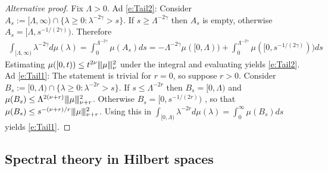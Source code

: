 \documentclass[10pt, a4paper]{iopart}
\newcommand{\normiii}[2]{\vert\kern-0.25ex\vert\kern-0.25ex\vert #1 \vert\kern-0.25ex \vert\kern-0.25ex\vert_{ #2 }}
\theoremstyle{remark}
\theoremstyle{definition}
\begin{document}
{%
\begin{proof}[Alternative proof] %
	Fix $\Lambda > 0$.
	Ad \eqref{e:Tail2}:
	Consider
	$A_s := [\Lambda, \infty) \cap \{ \lambda \geq 0 : \lambda^{-2 \gamma} > s \}$.
	If $s \geq \Lambda^{-2 \gamma}$ then $A_s$ is empty,
	otherwise
	$A_s = [\Lambda, s^{-1/(2\gamma)})$.
	Therefore
	\begin{align}
		\int_{[\Lambda, \infty)} \lambda^{-2 \gamma} d\mu(\lambda)
		=
		\int_0^{\Lambda^{-2 \gamma}} \mu(A_s) ds
		=
		-\Lambda^{-2\gamma} \mu([0, \Lambda))
		+
		\int_0^{\Lambda^{-2 \gamma}} \mu([0, s^{-1/(2\gamma)})) ds
	\end{align}
	Estimating $\mu([0, t)) \leq t^{2 \nu} \normiii{\mu}{\nu}^2$ under the integral
	and evaluating
	yields \eqref{e:Tail2}.
	Ad \eqref{e:Tail1}:
	The statement is trivial for $r = 0$, so suppose $r > 0$.
	Consider 
	$B_s := [0, \Lambda) \cap \{ \lambda \geq 0 : \lambda^{-2 r} > s \}$.
	If $s \leq \Lambda^{-2r}$ 
	then $B_s = [0, \Lambda)$ 
	and 
	$\mu(B_s) \leq \Lambda^{2 (\nu + r)} \normiii{\mu}{\nu + r}^2$.
	Otherwise
	$B_s = [0, s^{-1/(2r)})$ ,
	so that
	$\mu(B_s) \leq s^{-(\nu + r)/r} \normiii{\mu}{\nu + r}^2$.
	Using this in 
	$
		\int_{[0, \Lambda)} \lambda^{-2 r} d\mu(\lambda)
	=
		\int_0^\infty \mu(B_s) ds
	$
	yields \eqref{e:Tail1}.
\end{proof}
}
	
\subsection{Spectral theory in Hilbert spaces}
\label{s:i:H}
\end{document}

